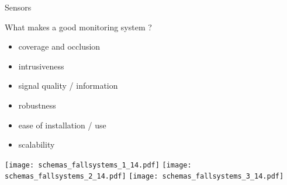 \begin{frame}{Sensors}{}
    
    \begin{minipage}[t]{0.49\linewidth}
        \vspace{0pt}
What makes a good monitoring system ?
        \begin{itemize}
            \item coverage and occlusion
            \item intrusiveness
            \item signal quality / information
            \item robustness
            \item ease of installation / use
            \item scalability
        \end{itemize}

    \end{minipage}\hfill
    \begin{minipage}[t]{0.49\linewidth}
        \vspace{0pt}
        \begin{overprint}
            \texttt{[image: schemas\_fallsystems\_1\_14.pdf]}
            \texttt{[image: schemas\_fallsystems\_2\_14.pdf]}
            \texttt{[image: schemas\_fallsystems\_3\_14.pdf]}
        \end{overprint}
    \end{minipage}


\end{frame}
